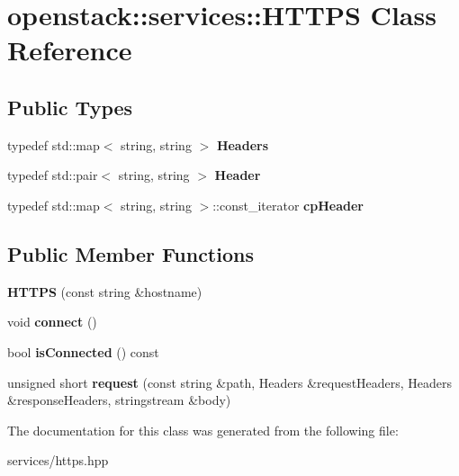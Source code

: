 \hypertarget{classopenstack_1_1services_1_1HTTPS}{
\section{openstack::services::HTTPS Class Reference}
\label{classopenstack_1_1services_1_1HTTPS}
}
\subsection*{Public Types}
\begin{DoxyCompactItemize}
\item 
\hypertarget{classopenstack_1_1services_1_1HTTPS_a86e9de849e0b747de165fc7cf485c8de}{
typedef std::map$<$ string, string $>$ {\bfseries Headers}}
\label{classopenstack_1_1services_1_1HTTPS_a86e9de849e0b747de165fc7cf485c8de}

\item 
\hypertarget{classopenstack_1_1services_1_1HTTPS_a3fe02268eadcc1ddfbf18de029e5b4d6}{
typedef std::pair$<$ string, string $>$ {\bfseries Header}}
\label{classopenstack_1_1services_1_1HTTPS_a3fe02268eadcc1ddfbf18de029e5b4d6}

\item 
\hypertarget{classopenstack_1_1services_1_1HTTPS_a1de260bd99a79d6cc71c0fedf5a9e128}{
typedef std::map$<$ string, string $>$::const\_\-iterator {\bfseries cpHeader}}
\label{classopenstack_1_1services_1_1HTTPS_a1de260bd99a79d6cc71c0fedf5a9e128}

\end{DoxyCompactItemize}
\subsection*{Public Member Functions}
\begin{DoxyCompactItemize}
\item 
\hypertarget{classopenstack_1_1services_1_1HTTPS_ab7f4cfb8dcf2ebef160efa423ddd6759}{
{\bfseries HTTPS} (const string \&hostname)}
\label{classopenstack_1_1services_1_1HTTPS_ab7f4cfb8dcf2ebef160efa423ddd6759}

\item 
\hypertarget{classopenstack_1_1services_1_1HTTPS_acdf390b8d3ce0be2a0e4feb75aa2eb09}{
void {\bfseries connect} ()}
\label{classopenstack_1_1services_1_1HTTPS_acdf390b8d3ce0be2a0e4feb75aa2eb09}

\item 
\hypertarget{classopenstack_1_1services_1_1HTTPS_ab819840b881c014fac17739be2f2169a}{
bool {\bfseries isConnected} () const }
\label{classopenstack_1_1services_1_1HTTPS_ab819840b881c014fac17739be2f2169a}

\item 
\hypertarget{classopenstack_1_1services_1_1HTTPS_a98208f49bd5c7f6d8510b19a2fdbb7b9}{
unsigned short {\bfseries request} (const string \&path, Headers \&requestHeaders, Headers \&responseHeaders, stringstream \&body)}
\label{classopenstack_1_1services_1_1HTTPS_a98208f49bd5c7f6d8510b19a2fdbb7b9}

\end{DoxyCompactItemize}


The documentation for this class was generated from the following file:\begin{DoxyCompactItemize}
\item 
services/https.hpp\end{DoxyCompactItemize}
